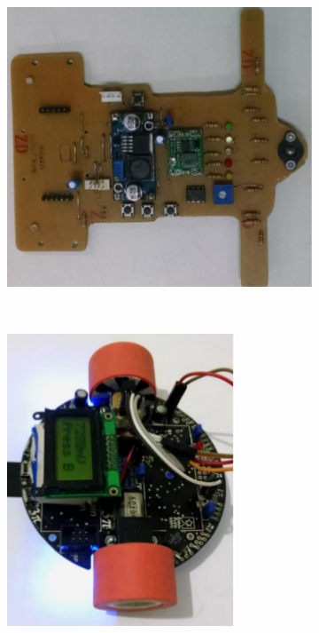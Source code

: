 \begin{figure}[h]
    \centering
    \captionsetup{width=0.83\textwidth,font=footnotesize,textfont=bf}
    \begin{subfigure}[b]{0.4\textwidth}
        \includegraphics[width=\textwidth,height=0.18\textheight]{figuras/marcio1.png}
        \caption{\centering \label{fig:marcio}}
    \end{subfigure}
    ~ %
    \begin{subfigure}[b]{0.4\textwidth}
	\centering
        \includegraphics[width=0.75\textwidth,height=0.18\textheight]{figuras/polulumod.png}
        \caption{\centering \label{fig:pololu}}
    \end{subfigure}
    

\end{figure}
